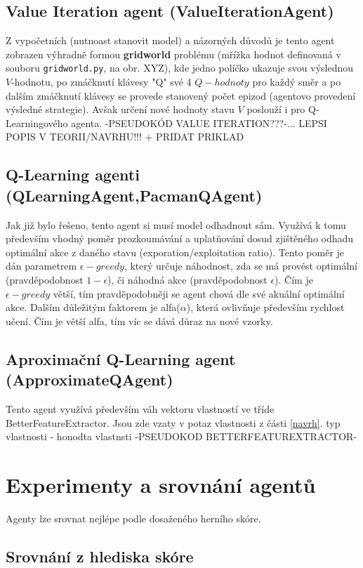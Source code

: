 \section{Value Iteration agent (ValueIterationAgent)}
Z vypočetních (nutnoast stanovit model) a názorných důvodů je tento agent zobrazen výhradně formou \textbf{gridworld} problému (mřížka hodnot definovaná v souboru \texttt{gridworld.py}, na obr. XYZ), kde jedno políčko ukazuje svou výslednou $V$-hodnotu, po zmáčknutí klávesy "Q" své 4 $Q-hodnoty$ pro každý směr a po dalším zmáčknutí klávesy se provede stanovený počet epizod (agentovo provedení výsledné strategie).
Avšak určení nové hodnoty stavu $V$ poslouží i pro Q-Learningového agenta.
-PSEUDOKÓD VALUE ITERATION???-... LEPSI POPIS V TEORII/NAVRHU!!! + PRIDAT PRIKLAD

\section{Q-Learning agenti (QLearningAgent,PacmanQAgent)}
Jak již bylo řešeno, tento agent si musí model odhadnout sám. Využívá k tomu především vhodný poměr prozkoumávání a uplatňování dosud zjištěného odhadu optimální akce z daného stavu (exporation/exploitation ratio). Tento poměr je dán parametrem $\epsilon-greedy$, který určuje náhodnost, zda se má provést optimální (pravděpodobnost $1-\epsilon$), či náhodná akce (pravděpodobnost $\epsilon$). Čím je $\epsilon-greedy$ větší, tím pravděpodobněji se agent chová dle své akuální optimální akce. Dalším důležitým faktorem je alfa($\alpha$), která ovlivňuje především rychlost učení. Čím je větší alfa, tím víc se dává důraz na nové vzorky.

\section{Aproximační Q-Learning agent (ApproximateQAgent)}
Tento agent využívá především váh vektoru vlastností ve tříde BetterFeatureExtractor. Jsou zde vzaty v potaz vlastnosti z části \ref{navrh}.
\newline
typ vlastnosti - honodta vlastnsti
-PSEUDOKOD BETTERFEATUREXTRACTOR-

\chapter{Experimenty a srovnání agentů}
Agenty lze srovnat nejlépe podle dosaženého herního skóre.
\section{Srovnání z hlediska skóre}
